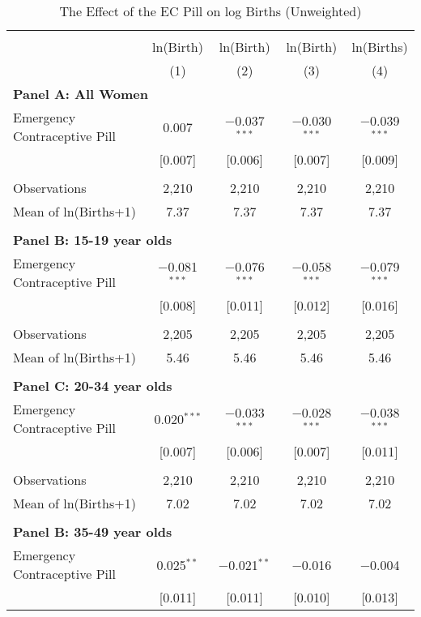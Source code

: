 \begin{table}[!htbp] \centering
\caption{The Effect of the EC Pill on log Births (Unweighted)}
\label{TEENtab:aggregateLogunweight}
\begin{tabular}{@{\extracolsep{5pt}}lcccc}
\\[-1.8ex]\hline \hline \\[-1.8ex] 
& ln(Birth)&ln(Birth)&ln(Birth)&ln(Births) \\
&(1)&(2)&(3)&(4) \\ \hline
\multicolumn{5}{l}{\textbf{
\noindent Panel A: All Women}} \\
Emergency Contraceptive Pill&0.007&$-$0.037$^{***}$&$-$0.030$^{***}$&$-$0.039$^{***}$\\
            &[0.007]&[0.006]&[0.007]&[0.009]\\
 & & & & \\
Observations&2,210&2,210&2,210&2,210\\
Mean of ln(Births+1)&7.37&7.37&7.37&7.37\\
 & & & & \\
\multicolumn{5}{l}{\noindent \textbf{
Panel B: 15-19 year olds}} \\
Emergency Contraceptive Pill&$-$0.081$^{***}$&$-$0.076$^{***}$&$-$0.058$^{***}$&$-$0.079$^{***}$\\
            &[0.008]&[0.011]&[0.012]&[0.016]\\
 & & & & \\
Observations&2,205&2,205&2,205&2,205\\
Mean of ln(Births+1)&5.46&5.46&5.46&5.46\\
 & & & & \\
\multicolumn{5}{l}{\noindent \textbf{
Panel C: 20-34 year olds}} \\
Emergency Contraceptive Pill&0.020$^{***}$&$-$0.033$^{***}$&$-$0.028$^{***}$&$-$0.038$^{***}$\\
            &[0.007]&[0.006]&[0.007]&[0.011]\\
 & & & & \\
Observations&2,210&2,210&2,210&2,210\\
Mean of ln(Births+1)&7.02&7.02&7.02&7.02\\
 & & & & \\
\multicolumn{5}{l}{\noindent \textbf{
Panel B: 35-49 year olds}} \\
Emergency Contraceptive Pill&0.025$^{**}$&$-$0.021$^{**}$&$-$0.016&$-$0.004\\
            &[0.011]&[0.011]&[0.010]&[0.013]\\

\end{tabular}
\end{table}
